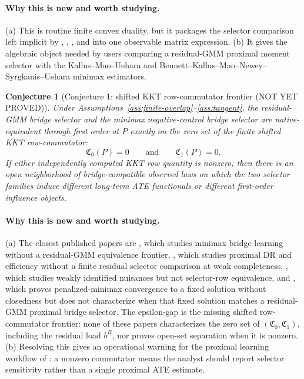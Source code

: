 \documentclass[11pt]{article}
\theoremstyle{definition}
\theoremstyle{plain}
\newtheorem{conjecture}{Conjecture}
\theoremstyle{remark}
\begin{document}
\paragraph{Why this is new and worth studying.}
(a) This is routine finite convex duality, but it packages the selector comparison left implicit by \citet{KallusMaoUehara2021}, \citet{MastouriZhuGultchinEtAl2021}, \citet{CuiPuShiMiaoTchetgen2024}, and \citet{BennettKallusMaoNeweySyrgkanisUehara2023MinimaxIV} into one observable matrix expression. (b) It gives the algebraic object needed by users comparing a residual-GMM proximal moment selector with the Kallus--Mao--Uehara and Bennett--Kallus--Mao--Newey--Syrgkanis--Uehara minimax estimators.

\begin{conjecture}[Conjecture 1: shifted KKT row-commutator frontier (NOT YET PROVED)]\label{conj:frontier}
Under Assumptions~\ref{ass:finite-overlap}--\ref{ass:tangent}, the residual-GMM bridge selector and the minimax negative-control bridge selector are native-equivalent through first order at \(P\) exactly on the zero set of the finite shifted KKT row-commutator:
\[
\mathfrak C_0(P)=0\qquad\text{and}\qquad \mathfrak C_1(P)=0.
\]
If either independently computed KKT row quantity is nonzero, then there is an open neighborhood of bridge-compatible observed laws on which the two selector families induce different long-term ATE functionals or different first-order influence objects.
\end{conjecture}

\paragraph{Why this is new and worth studying.}
(a) The closest published papers are \citet[Sections 3--4]{KallusMaoUehara2021}, which studies minimax bridge learning without a residual-GMM equivalence frontier, \citet[Section 3, equation (9) and Theorem 3.2]{CuiPuShiMiaoTchetgen2024}, which studies proximal DR and efficiency without a finite residual selector comparison at weak completeness, \citet[abstract and Section 2]{BennettKallusMaoNeweySyrgkanisUehara2023COLT}, which studies weakly identified nuisances but not selector-row equivalence, and \citet[abstract and Theorem 4]{BennettKallusMaoNeweySyrgkanisUehara2023MinimaxIV}, which proves penalized-minimax convergence to a fixed solution without closedness but does not characterize when that fixed solution matches a residual-GMM proximal bridge selector. The epsilon-gap is the missing shifted row-commutator frontier: none of these papers characterizes the zero set of \((\mathfrak C_0,\mathfrak C_1)\), including the residual load \(b^R\), nor proves open-set separation when it is nonzero. (b) Resolving this gives an operational warning for the proximal learning workflow of \citet{KallusMaoUehara2021}: a nonzero commutator means the analyst should report selector sensitivity rather than a single proximal ATE estimate.
\end{document}

